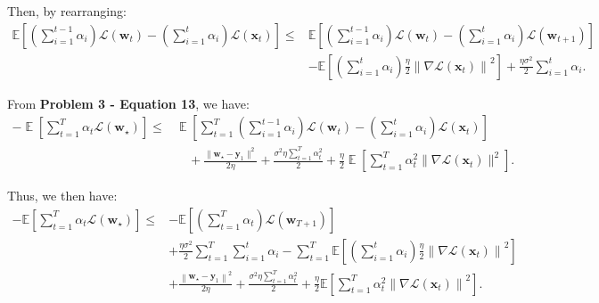 \documentclass[letterpaper]{article}
\newcommand{\E}{\mathop{\mathbb{E}}}
\renewcommand{\L}{\mathcal{L}}
\newcommand{\bx}{\mathbf{x}}
\newcommand{\by}{\mathbf{y}}
\newcommand{\bw}{\mathbf{w}}
\begin{document}
\begin{enumerate}
Then, by rearranging:
\begin{equation}
	\begin{aligned}
		\mathbb{E}\left[\left(\sum_{i=1}^{t-1} \alpha_i\right) \mathcal{L}\left(\mathbf{w}_t\right)-\left(\sum_{i=1}^t \alpha_i\right) \mathcal{L}\left(\mathbf{x}_t\right)\right] \leq & \mathbb{E}\left[\left(\sum_{i=1}^{t-1} \alpha_i\right) \mathcal{L}\left(\mathbf{w}_t\right)-\left(\sum_{i=1}^t \alpha_i\right) \mathcal{L}\left(\mathbf{w}_{t+1}\right)\right] \\
		& -\mathbb{E}\left[\left(\sum_{i=1}^t \alpha_i\right) \frac{\eta}{2}\left\|\nabla \mathcal{L}\left(\mathbf{x}_t\right)\right\|^2\right]+\frac{\eta \sigma^2}{2} \sum_{i=1}^t \alpha_i.
	\end{aligned}
\end{equation}

From \textbf{Problem 3 - Equation 13}, we have:
\begin{equation}
	\begin{aligned}
		-\E\left[\sum_{t=1}^T \alpha_t  \L(\bw_\star)\right] \le & \E\left[\sum_{t=1}^T \left(\sum_{i=1}^{t-1} \alpha_i\right)\L(\bw_t) - \left(\sum_{i=1}^{t} \alpha_i\right)\L(\bx_t)\right] \\
		&\quad+ \frac{\|\bw_\star-\by_1\|^2}{2\eta}+ \frac{\sigma^2 \eta \sum_{t=1}^T \alpha_t^2 }{2}+\frac{\eta}{2}\E\left[\sum_{t=1}^T \alpha_t^2\|\nabla \L(\bx_t)\|^2\right].
	\end{aligned}
\end{equation}

Thus, we then have:
\begin{equation}
	\begin{aligned}
		-\mathbb{E}\left[\sum_{t=1}^T \alpha_t \mathcal{L}\left(\mathbf{w}_{\star}\right)\right] \leq & -\mathbb{E}\left[\left(\sum_{t=1}^T \alpha_t\right) \mathcal{L}\left(\mathbf{w}_{T+1}\right)\right]\\
		& +\frac{\eta \sigma^2}{2} \sum_{t=1}^T \sum_{i=1}^t \alpha_i-\sum_{t=1}^T \mathbb{E}\left[\left(\sum_{i=1}^t \alpha_i\right) \frac{\eta}{2}\left\|\nabla \mathcal{L}\left(\mathbf{x}_t\right)\right\|^2\right] \\
		& +\frac{\left\|\mathbf{w}_{\star}-\mathbf{y}_1\right\|^2}{2 \eta}+\frac{\sigma^2 \eta \sum_{t=1}^T \alpha_t^2}{2}+\frac{\eta}{2} \mathbb{E}\left[\sum_{t=1}^T \alpha_t^2\left\|\nabla \mathcal{L}\left(\mathbf{x}_t\right)\right\|^2\right].
	\end{aligned}
\end{equation}


\end{enumerate}
\end{document}
